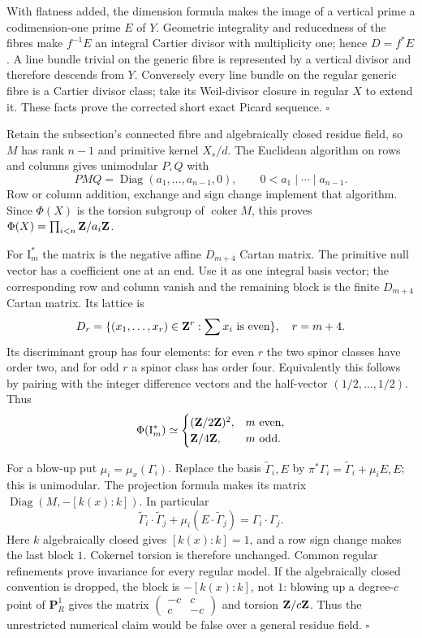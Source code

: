 \documentclass[11pt]{article}
\let\chapterexercise\exercise
\renewcommand{\exercise}[2]{\Needspace{8\baselineskip}\chapterexercise{#1}{#2}}
\begin{document}
With flatness added, the dimension formula makes the image of a vertical prime a codimension-one prime $E$ of $Y$. Geometric integrality and reducedness of the fibres make $f^{-1}E$ an integral Cartier divisor with multiplicity one; hence $D=f^*E$. A line bundle trivial on the generic fibre is represented by a vertical divisor and therefore descends from $Y$. Conversely every line bundle on the regular generic fibre is a Cartier divisor class; take its Weil-divisor closure in regular $X$ to extend it. These facts prove the corrected short exact Picard sequence. \hfill$\square$

\pf Retain the subsection's connected fibre and algebraically closed residue field, so $M$ has rank $n-1$ and primitive kernel $X_s/d$. The Euclidean algorithm on rows and columns gives unimodular $P,Q$ with
\[ PMQ=\operatorname{Diag}(a_1,\ldots,a_{n-1},0),\qquad
0<a_1\mid\cdots\mid a_{n-1}. \]
Row or column addition, exchange and sign change implement that algorithm. Since $\Phi(X)$ is the torsion subgroup of $\operatorname{coker}M$, this proves $\Phi(X)=\prod_{i<n}\mathbf Z/a_i\mathbf Z$.

For $\mathrm I_m^*$ the matrix is the negative affine $D_{m+4}$ Cartan matrix. The primitive null vector has a coefficient one at an end. Use it as one integral basis vector; the corresponding row and column vanish and the remaining block is the finite $D_{m+4}$ Cartan matrix. Its lattice is
\[ D_r=\{(x_1,\ldots,x_r)\in\mathbf Z^r:\sum x_i\text{ is even}\},\quad r=m+4. \]
Its discriminant group has four elements: for even $r$ the two spinor classes have order two, and for odd $r$ a spinor class has order four. Equivalently this follows by pairing with the integer difference vectors and the half-vector $(1/2,\ldots,1/2)$. Thus
\[ \Phi(\mathrm I_m^*)\simeq
\begin{cases}(\mathbf Z/2\mathbf Z)^2,&m\text{ even},\\
\mathbf Z/4\mathbf Z,&m\text{ odd}.
\end{cases} \]

For a blow-up put $\mu_i=\mu_x(\Gamma_i)$. Replace the basis $\widetilde\Gamma_i,E$ by $\pi^*\Gamma_i=\widetilde\Gamma_i+\mu_iE,E$; this is unimodular. The projection formula makes its matrix $\operatorname{Diag}(M,-[k(x):k])$. In particular
\[ \widetilde\Gamma_i\cdot\widetilde\Gamma_j+
\mu_i(E\cdot\widetilde\Gamma_j)=\Gamma_i\cdot\Gamma_j. \]
Here $k$ algebraically closed gives $[k(x):k]=1$, and a row sign change makes the last block $1$. Cokernel torsion is therefore unchanged. Common regular refinements prove invariance for every regular model. If the algebraically closed convention is dropped, the block is $-[k(x):k]$, not $1$: blowing up a degree-$c$ point of $\mathbf P^1_R$ gives the matrix $\left(\begin{smallmatrix}-c&c\\c&-c\end{smallmatrix}\right)$ and torsion $\mathbf Z/c\mathbf Z$. Thus the unrestricted numerical claim would be false over a general residue field. \hfill$\square$
\end{document}
